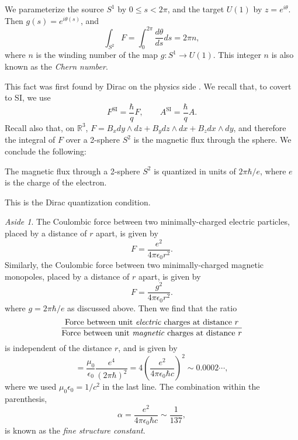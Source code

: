 \documentclass[12pt]{article}
\numberwithin{equation}{section}
\theoremstyle{remark}
\newtheorem{aside}[definition]{Aside}
\def\bR{\mathbb{R}}
\begin{document}
We parameterize the source $S^1$ by $0\le s < 2\pi$,
and the target $U(1)$ by $z=e^{i\theta}$.
Then $g(s)=e^{i\theta(s)}$, and \begin{equation}
\int_{S^2} F = \int_0^{2\pi} \frac{d\theta}{ds} ds = 2\pi n,
\end{equation}
where $n$ is the winding number of the map $g:S^1\to U(1)$.
This integer $n$ is also known as the \emph{Chern number}.

This fact was first found by Dirac on the physics side \cite{Dirac}.
We recall that, to covert to SI, we use \begin{equation}
  F^\text{SI} = \frac{\hbar}{q} F,\qquad
  A^\text{SI} = \frac{\hbar}{q} A.
\end{equation} 
Recall also that, on $\bR^3$,
$F=B_{x}dy\wedge dz + B_{y}dz\wedge dx + B_{z}dx\wedge dy$,
and therefore the integral of $F$ over a 2-sphere $S^2$ is the magnetic flux through the sphere.
We conclude the following:
\begin{proposition}
The magnetic flux through a 2-sphere $S^2$ is quantized in units of $2\pi \hbar/e$,
where $e$ is the charge of the electron.
\end{proposition}
This is the Dirac quantization condition.

\begin{aside}
The Coulombic force between two minimally-charged electric particles, 
placed by a distance of $r$ apart, is given by \begin{equation}
  F = \frac{e^2}{4\pi \epsilon_0 r^2}.
\end{equation} 
Similarly, the Coulombic force between two minimally-charged magnetic monopoles,
placed by a distance of $r$ apart, is given by \begin{equation}
  F = \frac{g^2}{4\pi \epsilon_0 r^2}.
\end{equation} where $g=2\pi \hbar/e$ as discussed above.
Then we find that the ratio \begin{equation}
\frac{\text{Force between unit \emph{electric} charges at distance $r$}}
{\text{Force between unit \emph{magnetic} charges at distance $r$}}
\end{equation}
is independent of the distance $r$, and is given by 
\begin{equation}
= \frac{\mu_0}{\epsilon_0} \frac{e^4}{(2\pi \hbar)^2}
= 4 (\frac{e^2}{4\pi \epsilon_0 \hbar c })^2 \sim 0.0002\cdots,
\end{equation} 
where we used $\mu_0 \epsilon_0=1/c^2$ in the last line.
The combination within the parenthesis, \begin{equation}
\alpha = \frac{e^2}{4\pi \epsilon_0 \hbar c } \sim \frac{1}{137},
\end{equation} is known as the \emph{fine structure constant}.
\end{aside}
\end{document}
